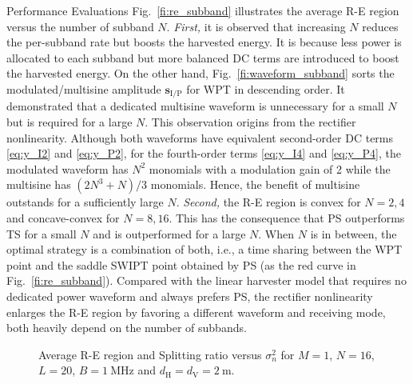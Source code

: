 \documentclass[journal]{IEEEtran}
\begin{document}
\begin{section}{Performance Evaluations}
		Fig.~\ref{fi:re_subband} illustrates the average R-E region versus the number of subband $N$. \emph{First,} it is observed that increasing $N$ reduces the per-subband rate but boosts the harvested energy. It is because less power is allocated to each subband but more balanced DC terms are introduced to boost the harvested energy. On the other hand, Fig.~\ref{fi:waveform_subband} sorts the modulated/multisine amplitude $\boldsymbol{s}_{\mathrm{I/P}}$ for WPT in descending order. It demonstrated that a dedicated multisine waveform is unnecessary for a small $N$ but is required for a large $N$. This observation origins from the rectifier nonlinearity. Although both waveforms have equivalent second-order DC terms \eqref{eq:y_I2} and \eqref{eq:y_P2}, for the fourth-order terms \eqref{eq:y_I4} and \eqref{eq:y_P4}, the modulated waveform has $N^2$ monomials with a modulation gain of \num{2} while the multisine has $(2N^3+N)/3$ monomials. Hence, the benefit of multisine outstands for a sufficiently large $N$. \emph{Second,} the R-E region is convex for $N=2,4$ and concave-convex for $N=8,16$. This has the consequence that PS outperforms TS for a small $N$ and is outperformed for a large $N$. When $N$ is in between, the optimal strategy is a combination of both, i.e., a time sharing between the WPT point and the saddle SWIPT point obtained by PS (as the red curve in Fig.~\ref{fi:re_subband}). Compared with the linear harvester model that requires no dedicated power waveform and always prefers PS, the rectifier nonlinearity enlarges the R-E region by favoring a different waveform and receiving mode, both heavily depend on the number of subbands.

		\begin{figure}[!t]
			\centering
			\caption{Average R-E region and Splitting ratio versus $\sigma_n^2$ for $M=1$, $N=16$, $L=20$, $B=\SI{1}{\MHz}$ and $d_{\mathrm{H}}=d_{\mathrm{V}}=\SI{2}{\meter}$.}
		\end{figure}


\end{section}
\end{document}

